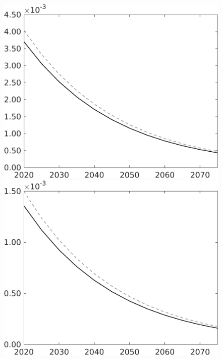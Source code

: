 \documentclass[12pt]{article}
\begin{document}
\begin{figure}[h!!]
\begin{minipage}[]{0.32\textwidth}
	\end{minipage}	
	\begin{minipage}[]{0.32\textwidth}
		\includegraphics[width=1\textwidth]{../../codding_model/own_basedOnFried/optimalPol_010922_revision/figures/all_13Sept22/CompTaul_Equlab_LFBAU_Reg0_Lf_spillover0_nsk0_xgr1_knspil1_sep1_countec0_GovRev0_etaa0.79_lgd0.png}
	\end{minipage}	
	\begin{minipage}[]{0.32\textwidth}
		\includegraphics[width=1\textwidth]{../../codding_model/own_basedOnFried/optimalPol_010922_revision/figures/all_13Sept22/CompTaul_Equlab_LFBAU_Reg0_Lg_spillover0_nsk0_xgr1_knspil1_sep1_countec0_GovRev0_etaa0.79_lgd0.png}

\end{minipage}
\end{figure}
\end{document}
